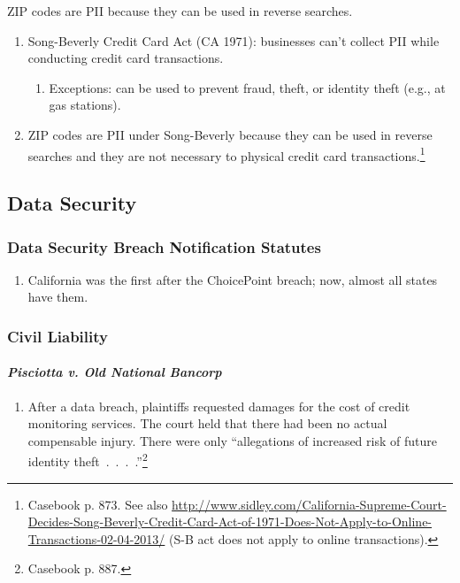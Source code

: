 ZIP codes are PII because they can be used in reverse searches.

\begin{enumerate}
    \item Song-Beverly Credit Card Act (CA 1971): businesses can't collect PII 
    while conducting credit card transactions. 
    \begin{enumerate}
        \item Exceptions: can be used to prevent fraud, theft, or identity 
        theft (e.g., at gas stations).
    \end{enumerate}
    \item ZIP codes are PII under Song-Beverly because they can be used in 
    reverse searches and they are not necessary to physical credit card 
    transactions.\footnote{Casebook p. 873. See also 
    \url{http://www.sidley.com/California-Supreme-Court-Decides-Song-Beverly-Credit-Card-Act-of-1971-Does-Not-Apply-to-Online-Transactions-02-04-2013/} 
    (S-B act does not apply to online transactions).}
\end{enumerate}

\subsection{Data Security}

\subsubsection{Data Security Breach Notification Statutes}

\begin{enumerate}
    \item California was the first after the ChoicePoint breach; now, almost all 
    states have them.
\end{enumerate}

\subsubsection{Civil Liability}

\paragraph{\emph{Pisciotta v. Old National Bancorp}}

\begin{enumerate}
    \item After a data breach, plaintiffs requested damages for the cost of 
    credit monitoring services. The court held that there had been no actual 
    compensable injury. There were only ``allegations of increased risk of 
    future identity theft~.~.~.~.''\footnote{Casebook p. 887.}
\end{enumerate}


